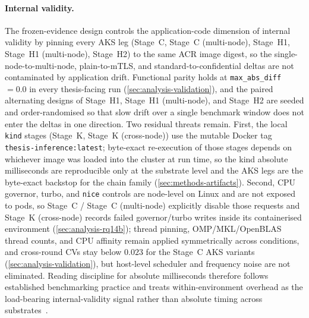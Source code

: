 \paragraph{Internal validity.}
The frozen-evidence design controls the application-code dimension of
internal validity by pinning every AKS leg (Stage~C, Stage~C (multi-node), Stage~H1,
Stage~H1 (multi-node), Stage~H2) to the same ACR image digest, so the
single-node-to-multi-node, plain-to-mTLS, and standard-to-confidential
deltas are not contaminated by application drift. Functional parity
holds at \texttt{max\_abs\_diff}~$=0.0$ in every thesis-facing run
(\cref{sec:analysis-validation}), and the paired alternating designs
of Stage~H1, Stage~H1 (multi-node), and Stage~H2 are seeded and order-randomised so that
slow drift over a single benchmark window does not enter the deltas in
one direction. Two residual threats remain. First, the local
\texttt{kind} stages (Stage~K, Stage~K (cross-node)) use the mutable Docker tag
\texttt{thesis-inference:latest}; byte-exact re-execution of those
stages depends on whichever image was loaded into the cluster at run
time, so the kind absolute milliseconds are reproducible only at the
substrate level and the AKS legs are the byte-exact backstop for the
chain family (\cref{sec:methods-artifacts}). Second, CPU governor,
turbo, and \texttt{nice} controls are node-level on Linux and are not
exposed to pods, so Stage~C / Stage~C (multi-node) explicitly disable those requests
and Stage~K (cross-node) records failed governor/turbo writes inside its
containerised environment (\cref{sec:analysis-rq14b}); thread pinning,
OMP/MKL/OpenBLAS thread counts, and CPU affinity remain applied
symmetrically across conditions, and cross-round CVs stay below
$0.023$ for the Stage~C AKS variants (\cref{sec:analysis-validation}), but
host-level scheduler and frequency noise are not eliminated. Reading
discipline for absolute milliseconds therefore follows established
benchmarking practice and treats within-environment overhead as the
load-bearing internal-validity signal rather than absolute timing
across substrates~\cite{benchmarking_sc15}.

